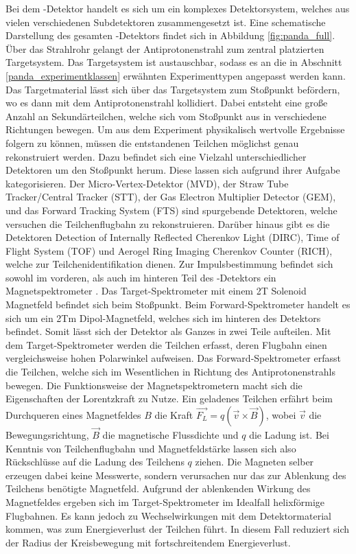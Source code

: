 Bei dem \pnd{}-Detektor handelt es sich um ein komplexes Detektorsystem, welches aus vielen verschiedenen Subdetektoren zusammengesetzt ist. Eine schematische Darstellung des gesamten \pnd{}-Detektors findet sich in Abbildung \ref{fig:panda_full}. Über das Strahlrohr gelangt der Antiprotonenstrahl zum zentral platzierten Targetsystem. Das Targetsystem ist austauschbar, sodass es an die in Abschnitt \ref{panda_experimentklassen} erwähnten Experimenttypen angepasst werden kann. Das Targetmaterial lässt sich über das Targetsystem zum Stoßpunkt befördern, wo es dann mit dem Antiprotonenstrahl kollidiert. Dabei entsteht eine große Anzahl an Sekundärteilchen, welche sich vom Stoßpunkt aus in verschiedene Richtungen bewegen. Um aus dem Experiment physikalisch wertvolle Ergebnisse folgern zu können, müssen die entstandenen Teilchen möglichst genau rekonstruiert werden. Dazu befindet sich eine Vielzahl unterschiedlicher Detektoren um den Stoßpunkt herum. Diese lassen sich aufgrund ihrer Aufgabe kategorisieren. Der Micro-Vertex-Detektor (MVD), der Straw Tube Tracker/Central Tracker (STT), der Gas Electron Multiplier Detector (GEM), und das Forward Tracking System (FTS) sind spurgebende Detektoren, welche versuchen die Teilchenflugbahn zu rekonstruieren. Darüber hinaus gibt es die Detektoren Detection of Internally Reflected Cherenkov Light (DIRC), Time of Flight System (TOF) und Aerogel Ring Imaging Cherenkov Counter (RICH), welche zur Teilchenidentifikation dienen. Zur Impulsbestimmung befindet sich sowohl im vorderen, als auch im hinteren Teil des \pnd{}-Detektors ein Magnetspektrometer . Das Target-Spektrometer mit einem 2T Solenoid Magnetfeld befindet sich beim Stoßpunkt. Beim Forward-Spektrometer handelt es sich um ein 2Tm Dipol-Magnetfeld, welches sich im hinteren des Detektors befindet. Somit lässt sich der Detektor als Ganzes in zwei Teile aufteilen. Mit dem Target-Spektrometer werden die Teilchen erfasst, deren Flugbahn einen vergleichsweise hohen Polarwinkel aufweisen. Das Forward-Spektrometer erfasst die Teilchen, welche sich im Wesentlichen in Richtung des Antiprotonenstrahls bewegen. Die Funktionsweise der Magnetspektrometern macht sich die Eigenschaften der Lorentzkraft zu Nutze. Ein geladenes Teilchen erfährt beim Durchqueren eines Magnetfeldes $B$ die Kraft $\vec{F_L}=q(\vec{v} \times \vec{B})$, wobei $\vec{v}$ die Bewegungsrichtung, $\vec{B}$ die magnetische Flussdichte und $q$ die Ladung ist. Bei Kenntnis von Teilchenflugbahn und Magnetfeldstärke lassen sich also Rückschlüsse auf die Ladung des Teilchens $q$ ziehen. Die Magneten selber erzeugen dabei keine Messwerte, sondern verursachen nur das zur Ablenkung des Teilchens benötigte Magnetfeld. \cite{PANDA_detektor} \cite[S. 7-10]{MasterJette}
Aufgrund der ablenkenden Wirkung des Magnetfeldes ergeben sich im Target-Spektrometer im Idealfall helixförmige Flugbahnen. Es kann jedoch zu Wechselwirkungen mit dem Detektormaterial kommen, was zum Energieverlust der Teilchen führt. In diesem Fall reduziert sich der Radius der Kreisbewegung mit fortschreitendem Energieverlust.
\cite[S. 11]{MasterJette}

